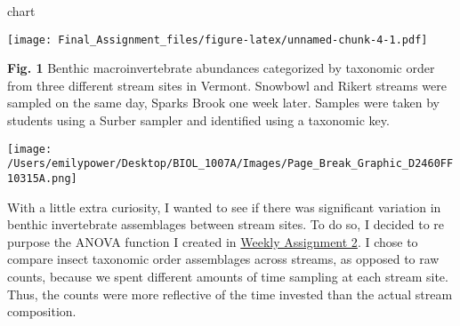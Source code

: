 \documentclass[
]{article}
\newenvironment{Shaded}{\begin{snugshade}}{\end{snugshade}}
\newcommand{\NormalTok}[1]{#1}
\begin{document}
\begin{Shaded}
\begin{Highlighting}[]
\NormalTok{chart}
\end{Highlighting}
\end{Shaded}

\texttt{[image: Final\_Assignment\_files/figure-latex/unnamed-chunk-4-1.pdf]}

\textbf{Fig. 1} Benthic macroinvertebrate abundances categorized by
taxonomic order from three different stream sites in Vermont. Snowbowl
and Rikert streams were sampled on the same day, Sparks Brook one week
later. Samples were taken by students using a Surber sampler and
identified using a taxonomic key.

\texttt{[image: /Users/emilypower/Desktop/BIOL\_1007A/Images/Page\_Break\_Graphic\_D2460FF10315A.png]}

With a little extra curiosity, I wanted to see if there was significant
variation in benthic invertebrate assemblages between stream sites. To
do so, I decided to re purpose the ANOVA function I created in
\href{/Users/emilypower/Desktop/BIOL_1007A/Weekly\%20Assignments/Weekly_Assignment_2.html}{Weekly
Assignment 2}. I chose to compare insect taxonomic order assemblages
across streams, as opposed to raw counts, because we spent different
amounts of time sampling at each stream site. Thus, the counts were more
reflective of the time invested than the actual stream composition.
\end{document}
